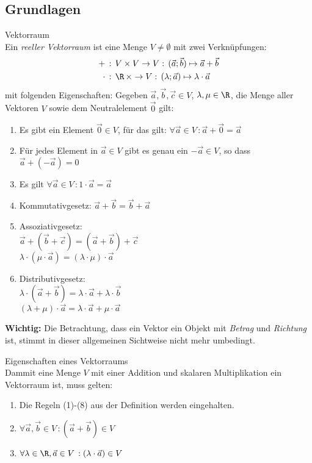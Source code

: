 \subsection{Grundlagen}
    \begin{definition}{Vektorraum}\\
        Ein \textit{reeller Vektorraum} ist eine Menge $V\neq\emptyset$ mit zwei Verknüpfungen:
        \begin{align*}
            +\,&:\,V\times V\rightarrow V:\,(\vec{a};\vec{b})\mapsto\vec{a}+\vec{b}\\
            \cdot\,&:\,\R\,\times\rightarrow V:\,(\lambda;\vec{a})\mapsto\lambda\cdot\vec{a}
        \end{align*}
        mit folgenden Eigenschaften:
        Gegeben $\vec{a},\vec{b},\vec{c}\in V$, $\lambda,\mu\in \R$, die Menge aller Vektoren $V$ 
        sowie dem Neutralelement $\vec{0}$ gilt:
        \begin{enumerate}
            \item Es gibt ein Element $\vec{0}\in V$, für das gilt: $\forall \vec{a}\in V\,:\vec{a}+\vec{0}=\vec{a}$
            \item Für jedes Element in $\vec{a}\in V$ gibt es genau ein $-\vec{a}\in V$, so dass $\vec{a}+(-\vec{a})=0$
            \item Es gilt $\forall \vec{a}\in V\,:1\cdot\vec{a}=\vec{a}$
            \item Kommutativgesetz: $\vec{a}+\vec{b}=\vec{b}+\vec{a}$
            \item Assoziativgesetz: \\
                $\vec{a}+(\vec{b}+\vec{c})=(\vec{a}+\vec{b})+\vec{c}$\\
                $\lambda\cdot(\mu\cdot\vec{a})=(\lambda\cdot\mu)\cdot\vec{a}$
            \item Distributivgesetz: \\
                $\lambda\cdot(\vec{a}+\vec{b})=\lambda\cdot\vec{a}+\lambda\cdot\vec{b}$\\
                $(\lambda+\mu)\cdot\vec{a}=\lambda\cdot\vec{a}+\mu\cdot\vec{a}$
        \end{enumerate}
        \textbf{Wichtig:} Die Betrachtung, dass ein Vektor ein Objekt mit \textit{Betrag} und \textit{Richtung} ist,
        stimmt in dieser allgemeinen Sichtweise nicht mehr umbedingt.
    \end{definition}

    \begin{theorem}{Eigenschaften eines Vektorraums}\\
        Dammit eine Menge $V$ mit einer Addition und skalaren Multiplikation ein Vektorraum ist, muss gelten:
        \begin{enumerate}
            \item Die Regeln (1)-(8) aus der Definition werden eingehalten.
            \item $\forall \vec{a},\vec{b}\in V\,:(\vec{a}+\vec{b})\in V$
            \item $\forall \lambda\in \R, \vec{a}\in V\,:(\lambda\cdot\vec{a})\in V$
        \end{enumerate}
    \end{theorem}

